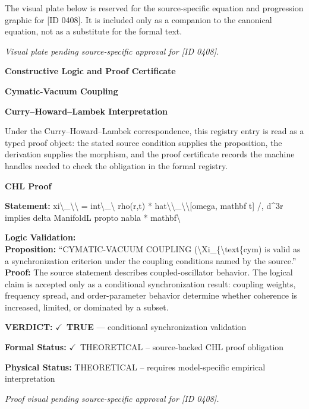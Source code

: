 \begingroup\footnotesize\sloppy
The visual plate below is reserved for the source-specific equation and progression graphic for [ID 0408]. It is included only as a companion to the canonical equation, not as a substitute for the formal text.
\par\endgroup
\begingroup\footnotesize\itshape
Visual plate pending source-specific approval for [ID 0408].
\par\endgroup

\clearpage
\begingroup\tzpsupportsetup
\noindent\textbf{\fontsize{10.8pt}{12.8pt}\selectfont [ID 0408] Constructive Logic and Proof Certificate}\par
\noindent\textbf{\fontsize{10pt}{12pt}\selectfont Cymatic-Vacuum Coupling}\par
\vspace{0.45em}
\begingroup
\footnotesize
\setlength{\parskip}{0.22em}
\setlength{\parindent}{0pt}
\noindent\textbf{Curry--Howard--Lambek Interpretation}\par
Under the Curry--Howard--Lambek correspondence, this registry entry is read as a typed proof
object: the stated source condition supplies the proposition, the derivation supplies the
morphism, and the proof certificate records the machine handles needed to check the obligation
in the formal registry.

\vspace{0.45em}
\noindent\textbf{CHL Proof}\par
\textbf{Statement:} xi\textbackslash{}\_\textbackslash{}\textbackslash{} = int\textbackslash{}\_\textbackslash{} rho(r,t) * hat\textbackslash{}\textbackslash{}\_\textbackslash{}\textbackslash{}[omega, mathbf t] /, d\textasciicircum{}3r implies delta ManifoldL
propto nabla * mathbf\textbackslash{}

\textbf{Logic Validation:}\\
\textbf{Proposition:} ``CYMATIC-VACUUM COUPLING (\textbackslash{}Xi\_\{\textbackslash{}text\{cym) is valid as a synchronization criterion under
the coupling conditions named by the source.''\\
\textbf{Proof:} The source statement describes coupled-oscillator behavior. The logical claim is
accepted only as a conditional synchronization result: coupling weights, frequency
spread, and order-parameter behavior determine whether coherence is increased, limited,
or dominated by a subset.

\textbf{VERDICT:} \ensuremath{\checkmark}\ \textbf{TRUE} --- conditional synchronization validation

\textbf{Formal Status:} \ensuremath{\checkmark}\ THEORETICAL -- source-backed CHL proof obligation

\textbf{Physical Status:} THEORETICAL -- requires model-specific empirical interpretation
\par\vspace{0.45em}
\par
\vfill
\begingroup\footnotesize\itshape
Proof visual pending source-specific approval for [ID 0408].
\par\endgroup
\vfill
\endgroup
\endgroup
